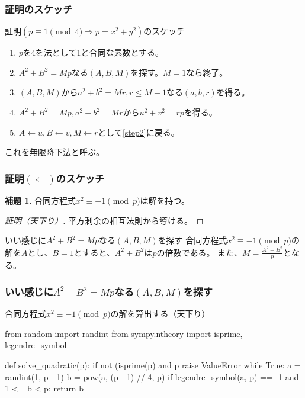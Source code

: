 \documentclass[dvipdfmx,11pt,notheorems]{beamer}
\theoremstyle{definition}
\newtheorem{lemma}{補題}
\begin{document}
\begin{frame}\frametitle{証明のスケッチ}

\begin{block}{証明$(p \equiv 1 \pmod{4} \Rightarrow p = x^{2} + y^{2})$のスケッチ}

\begin{enumerate}
\item $p$を4を法として1と合同な素数とする。
\item $A^{2}+B^{2} = Mp$なる$(A, B, M)$を探す。$M=1$なら終了。 \label{step2}
\item $(A, B, M)$から$a^{2}+b^{2}=Mr, r \leq M-1$なる$(a, b, r)$を得る。
\item $A^{2} + B^{2} = Mp, a^{2}+b^{2}=Mr$から$u^{2} + v^{2} = rp$を得る。
\item $A \leftarrow u, B \leftarrow v, M \leftarrow r$として\ref{step2}に戻る。
\end{enumerate}

\end{block}
これを無限降下法と呼ぶ。
\end{frame}

\begin{frame}\frametitle{証明$(\Leftarrow)$のスケッチ}

\begin{lemma}
合同方程式$x^{2} \equiv -1 \pmod{p}$は解を持つ。
\end{lemma}

\begin{proof}[証明（天下り）]
平方剰余の相互法則から導ける。
\end{proof}

\begin{exampleblock}{いい感じに$A^{2}+B^{2} = Mp$なる$(A, B, M)$を探す}
合同方程式$x^{2} \equiv -1 \pmod{p}$の解を$A$とし、$B=1$とすると、$A^{2}+B^{2}$は$p$の倍数である。
また、$\displaystyle M=\frac{A^{2} + B^{2}}{p}$となる。
\end{exampleblock}

\end{frame}

\begin{frame}[fragile]\frametitle{いい感じに$A^{2}+B^{2} = Mp$なる$(A, B, M)$を探す}

\begin{block}{合同方程式$x^{2} \equiv -1 \pmod{p}$の解を算出する（天下り）}
\begin{pyverbatim}
from random import randint
from sympy.ntheory import isprime, legendre_symbol


def solve_quadratic(p):
    if not (isprime(p) and p %
        raise ValueError
    while True:
        a = randint(1, p - 1)
        b = pow(a, (p - 1) // 4, p)
        if legendre_symbol(a, p) == -1 and 1 <= b < p:
            return b
\end{pyverbatim}
\end{block}

\end{frame}
\end{document}
